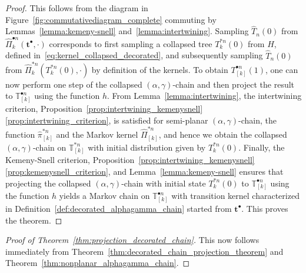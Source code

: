 \documentclass[a4paper, final]{amsart}
\theoremstyle{plain}
\theoremstyle{definition}
\newcommand{\tree}[1][t]{\boldsymbol{#1}}
\newcommand{\That}[1][T]{\widehat{#1}}
\newcommand{\T}{\mathbb{T}}
\begin{document}
\begin{proof}
  This follows from the diagram in Figure~\ref{fig:commutativediagram_complete} commuting by Lemmas~\ref{lemma:kemeny-snell} and~\ref{lemma:intertwining}. 
  Sampling $\That_n(0)$ from $\hat{\Pi}_k^{\bullet n} (\tree^\bullet, \cdot)$ corresponds to first sampling a collapsed tree $T_k^{*n}(0)$ from $H$, defined in~\ref{eq:kernel_collapsed_decorated}, and subsequently sampling $\That_n(0)$ from $\hat{\Pi}_{k}^{* n} \left( T_k^{* n}(0), \cdot \right)$ by definition of the kernels.
  To obtain $T_{[k]}^{\bullet n}(1)$, one can now perform one step of the collapsed $(\alpha, \gamma)$-chain and then project the result to $\T_{[k]}^{\bullet n}$ using the function $h$.
  From Lemma~\ref{lemma:intertwining}, the intertwining criterion, Proposition~\ref{prop:intertwining_kemenysnell}\ref{prop:intertwining_criterion}, is satisfied for semi-planar $(\alpha, \gamma)$-chain, the function $\hat{\pi}_{[k]}^{* n}$ and the Markov kernel $\hat{\Pi}_{[k]}^{* n}$, and hence we obtain the collapsed $(\alpha, \gamma)$-chain on $\T_{[k]}^{* n}$ with initial distribution given by $T_k^{* n}(0)$.
  Finally, the Kemeny-Snell criterion, Proposition~\ref{prop:intertwining_kemenysnell}\ref{prop:kemenysnell_criterion}, and Lemma~\ref{lemma:kemeny-snell} ensures that projecting the collapsed $(\alpha, \gamma)$-chain with initial state $T_k^{* n}(0)$ to $\T_{[k]}^{\bullet n}$ using the function $h$ yields a Markov chain on $\T_{[k]}^{\bullet n}$ with transition kernel characterized in Definition~\ref{def:decorated_alphagamma_chain} started from $\tree^\bullet$.
  This proves the theorem.
\end{proof}
%
\begin{proof}[Proof of Theorem~\ref{thm:projection_decorated_chain}]
  This now follows immediately from Theorem~\ref{thm:decorated_chain_projection_theorem} and Theorem~\ref{thm:nonplanar_alphagamma_chain}.
\end{proof}




\appendix
\end{document}
